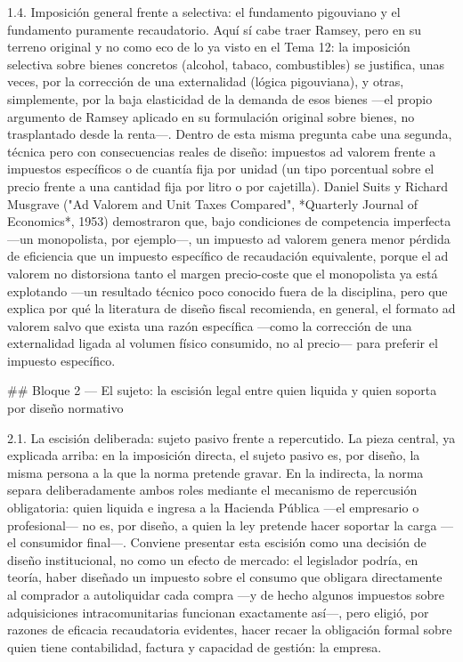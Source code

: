 \documentclass[10pt,a4paper]{article}
\begin{document}
1.4. Imposición general frente a selectiva: el fundamento pigouviano y el fundamento puramente recaudatorio. Aquí sí cabe traer Ramsey, pero en su terreno original y no como eco de lo ya visto en el Tema 12: la imposición selectiva sobre bienes concretos (alcohol, tabaco, combustibles) se justifica, unas veces, por la corrección de una externalidad (lógica pigouviana), y otras, simplemente, por la baja elasticidad de la demanda de esos bienes —el propio argumento de Ramsey aplicado en su formulación original sobre bienes, no trasplantado desde la renta—. Dentro de esta misma pregunta cabe una segunda, técnica pero con consecuencias reales de diseño: impuestos ad valorem frente a impuestos específicos o de cuantía fija por unidad (un tipo porcentual sobre el precio frente a una cantidad fija por litro o por cajetilla). Daniel Suits y Richard Musgrave ("Ad Valorem and Unit Taxes Compared", *Quarterly Journal of Economics*, 1953) demostraron que, bajo condiciones de competencia imperfecta —un monopolista, por ejemplo—, un impuesto ad valorem genera menor pérdida de eficiencia que un impuesto específico de recaudación equivalente, porque el ad valorem no distorsiona tanto el margen precio-coste que el monopolista ya está explotando —un resultado técnico poco conocido fuera de la disciplina, pero que explica por qué la literatura de diseño fiscal recomienda, en general, el formato ad valorem salvo que exista una razón específica —como la corrección de una externalidad ligada al volumen físico consumido, no al precio— para preferir el impuesto específico.

## Bloque 2 — El sujeto: la escisión legal entre quien liquida y quien soporta por diseño normativo

2.1. La escisión deliberada: sujeto pasivo frente a repercutido. La pieza central, ya explicada arriba: en la imposición directa, el sujeto pasivo es, por diseño, la misma persona a la que la norma pretende gravar. En la indirecta, la norma separa deliberadamente ambos roles mediante el mecanismo de repercusión obligatoria: quien liquida e ingresa a la Hacienda Pública —el empresario o profesional— no es, por diseño, a quien la ley pretende hacer soportar la carga —el consumidor final—. Conviene presentar esta escisión como una decisión de diseño institucional, no como un efecto de mercado: el legislador podría, en teoría, haber diseñado un impuesto sobre el consumo que obligara directamente al comprador a autoliquidar cada compra —y de hecho algunos impuestos sobre adquisiciones intracomunitarias funcionan exactamente así—, pero eligió, por razones de eficacia recaudatoria evidentes, hacer recaer la obligación formal sobre quien tiene contabilidad, factura y capacidad de gestión: la empresa.
\end{document}
